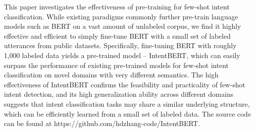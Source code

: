 This paper investigates the effectiveness of pre-training for few-shot intent classification. While existing paradigms commonly further pre-train language models such as BERT on a vast amount of unlabeled corpus, we find it highly effective and efficient to simply fine-tune BERT with a small set of labeled utterances from public datasets. Specifically, fine-tuning BERT with roughly 1,000 labeled data yields a pre-trained model -- IntentBERT, which can easily surpass the performance of existing pre-trained models for few-shot intent classification on novel domains with very different semantics. The high effectiveness of IntentBERT confirms the feasibility and practicality of few-shot intent detection, and its high generalization ability across different domains suggests that intent classification tasks may share a similar underlying structure, which can be efficiently learned from a small set of labeled data. The source code can be found at https://github.com/hdzhang-code/IntentBERT.
